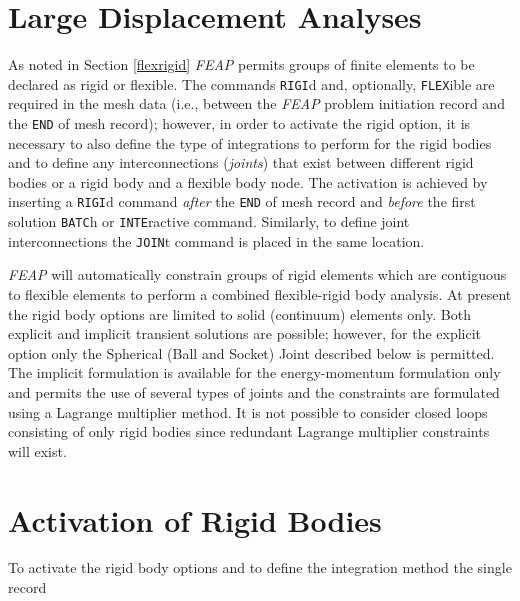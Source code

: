 \section{Large Displacement Analyses}

As noted in Section \ref{flexrigid}
{\sl FEAP} permits groups of finite elements to be declared as rigid
or flexible.  The commands {\tt RIGI}d and, optionally, {\tt FLEX}ible
are required in the mesh data (i.e., between the {\sl FEAP} problem
initiation record and the {\tt END} of mesh record); however,
in order to activate the rigid option, it is necessary to also define
the type of integrations to perform for the rigid bodies and to define
any interconnections ({\it joints}) that exist between different rigid
bodies or a rigid body and a flexible body node.  The activation is
achieved by inserting a {\tt RIGI}d command {\it after} the {\tt END}
of mesh record and {\it before} the first solution {\tt BATC}h
or {\tt INTE}ractive command.  Similarly, to define joint interconnections
the {\tt JOIN}t command is placed in the same location.

{\sl FEAP} will automatically constrain groups of rigid elements 
which are contiguous to flexible elements 
to perform a combined flexible-rigid body analysis.
At present the rigid body options are limited to solid (continuum)
elements only.
Both explicit and implicit transient solutions are possible; however, for
the explicit option only the Spherical (Ball and Socket) Joint described
below is permitted.
The implicit formulation is available for the energy-momentum formulation
only and permits the use of several types of joints and
the constraints are formulated using a Lagrange multiplier method.
It is not possible to consider closed loops
consisting of only rigid bodies since redundant Lagrange multiplier
constraints will exist.

\section{Activation of Rigid Bodies}

To activate the rigid body options and to
define the integration method the single record

